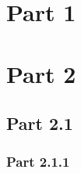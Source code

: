 \documentclass[12pt]{article} %
\begin{document}
\section{Part 1}

\newpage

\section{Part 2}

\subsection{Part 2.1}
\subsubsection{Part 2.1.1}


\end{document}
